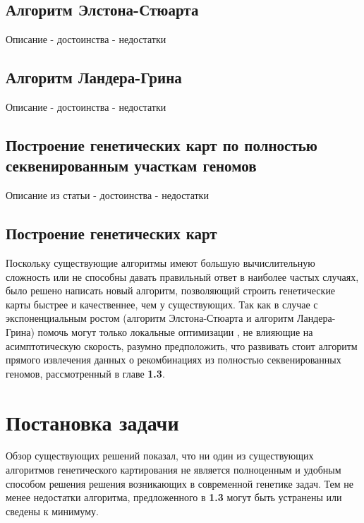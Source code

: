 \documentclass{matmex-diploma-custom}
\begin{document}
\subsection{Алгоритм Элстона-Стюарта}

\cite{elston1971general}

Описание - достоинства - недостатки

\subsection{Алгоритм Ландера-Грина}

\cite{lander1987construction, lander}

Описание - достоинства - недостатки

\subsection{Построение генетических карт по полностью секвенированным
участкам геномов}

Описание из статьи - достоинства - недостатки

\subsection*{Построение генетических карт}

Поскольку существующие алгоритмы имеют большую вычислительную
сложность или не способны давать правильный ответ в наиболее частых случаях,
было решено написать новый алгоритм, позволяющий строить генетические
карты быстрее и качественнее, чем у существующих. Так как в случае с
экспоненциальным ростом (алгоритм Элстона-Стюарта и алгоритм
Ландера-Грина) помочь могут только локальные оптимизации
\cite{o2001rapid, fishelson2002exact, fishelson2004optimizing}, не влияющие на
асимптотическую скорость, разумно предположить, что развивать стоит
алгоритм прямого извлечения данных о рекомбинациях из полностью
секвенированных геномов, рассмотренный в главе \textbf{1.3}.

\section{Постановка задачи}

Обзор существующих решений показал, что ни один из существующих
алгоритмов генетического картирования не является полноценным и
удобным способом решения решения возникающих в современной генетике
задач. Тем не менее недостатки алгоритма, предложенного в \textbf{1.3}
могут быть устранены или сведены к минимуму.
\end{document}
